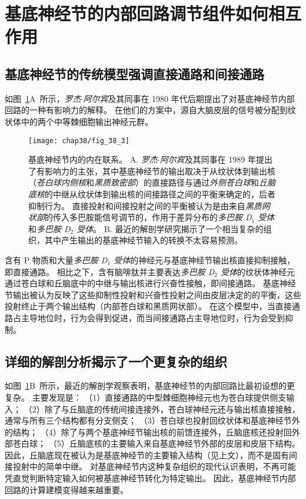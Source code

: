 \section{基底神经节的内部回路调节组件如何相互作用}

\subsection{基底神经节的传统模型强调直接通路和间接通路}

如图~\ref{fig:38_3}A~所示，\textit{罗杰$\cdot$阿尔宾}及其同事在 1980 年代后期提出了对基底神经节内部回路的一种有影响力的解释。
在他们的方案中，源自大脑皮层的信号被分配到纹状体中的两个中等棘细胞输出神经元群。


\begin{figure}[htbp]
	\centering
	\texttt{[image: chap38/fig\_38\_3]}
	\caption{基底神经节内的内在联系。
		A. \textit{罗杰$\cdot$阿尔宾}及其同事在 1989 年提出了有影响力的主张，其中基底神经节的输出取决于从纹状体到输出核（\textit{苍白球内侧核}和\textit{黑质致密部}）的直接路径与通过\textit{外侧苍白球}和\textit{丘脑底核}的中继从纹状体到输出核的间接路径之间的平衡来确定的，后者抑制行为。
		直接投射和间接投射之间的平衡被认为是由来自\textit{黑质网状部}的传入多巴胺能信号调节的，作用于差异分布的\textit{多巴胺 D$_1$ 受体}和\textit{多巴胺 D$_2$ 受体}。
		B. 最近的解剖学研究揭示了一个相当复杂的组织，其中产生输出的基底神经节输入的转换不太容易预测。}
	\label{fig:38_3}
\end{figure}


含有 P 物质和大量\textit{多巴胺 D$_1$ 受体}的神经元与基底神经节输出核直接抑制接触，即直接通路。
相比之下，含有脑啡肽并主要表达\textit{多巴胺 D$_2$ 受体}的纹状体神经元通过苍白球和丘脑底中的中继与输出核进行兴奋性接触，即间接通路。
基底神经节输出被认为反映了这些抑制性投射和兴奋性投射之间由皮层决定的的平衡，这些投射终止于两个输出结构（内部苍白球和黑质网状部）。
在这个模型中，当直接通路占主导地位时，行为会得到促进，而当间接通路占主导地位时，行为会受到抑制。



\subsection{详细的解剖分析揭示了一个更复杂的组织}

如图~\ref{fig:38_3}B~所示，最近的解剖学观察表明，基底神经节的内部回路比最初设想的更复杂。
主要发现是：
（1）直接通路的中型棘细胞神经元也为苍白球提供侧支输入； 
（2）除了与丘脑底的传统间接连接外，苍白球神经元还与输出核直接接触，通常与所有三个结构都有分支侧支；
（3）苍白球也投射回纹状体和基底神经节外的结构；
（4）除了与两个基底神经节输出核的前馈连接外，丘脑底核还投射回外部苍白球； 
（5）丘脑底核的主要输入来自基底神经节外部的皮层和皮层下结构。
因此，丘脑底现在被认为是基底神经节的主要输入结构（见上文），而不是固有间接投射中的简单中继。
对基底神经节内这种复杂组织的现代认识表明，不再可能凭直觉判断特定输入如何被基底神经节转化为特定输出。
因此，基底神经节内部回路的计算建模变得越来越重要。


